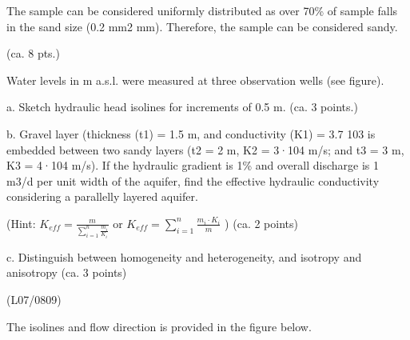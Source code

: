 \documentclass[letterpaper,10pt,english]{sphinxmanual}
\begin{document}
\noindent{}


The sample can be considered uniformly distributed as over 70\% of sample falls in the sand size (0.2 mm\sphinxhyphen{}2 mm). Therefore, the sample can be considered sandy.

 (ca. 8 pts.)

Water levels in m a.s.l. were measured at three observation wells (see figure).

\noindent{}

a. Sketch hydraulic head isolines for increments of 0.5 m. (ca. 3 points.)

b. Gravel layer (thickness (t1) = 1.5 m, and conductivity (K1) = 3.7 10\sphinxhyphen{}3 is embedded between two sandy layers (t2 = 2 m, K2 = 3·10\sphinxhyphen{}4 m/s; and t3 = 3 m, K3 = 4·10\sphinxhyphen{}4 m/s). If the hydraulic gradient is 1\% and overall discharge is 1 m3/d per unit width of the aquifer, find the effective hydraulic conductivity considering a parallelly layered aquifer.

(Hint: \(K_{eff} = \frac{m}{\sum_{i=1}^n \frac{m_i}{K_i}}\) or \(K_{eff} =  \sum_{i=1}^n\frac{m_i\cdot K_i}{m}\)  ) (ca. 2 points)

c. Distinguish between homogeneity and heterogeneity, and isotropy and anisotropy (ca. 3 points)

(L07/08\sphinxhyphen{}09)

The isolines and flow direction is provided in the figure below.

\noindent{}
\end{document}
